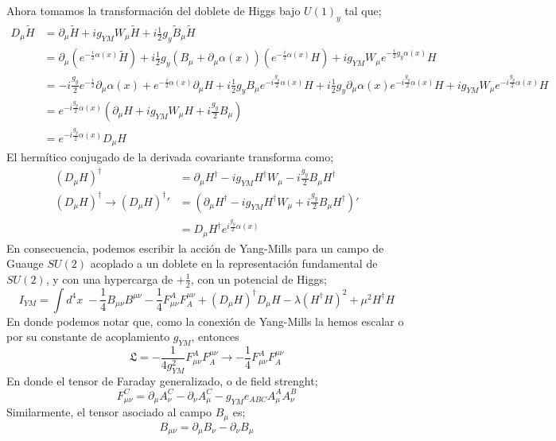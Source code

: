 \documentclass[../main.tex]{subfiles}
\begin{document}
 Ahora tomamos la transformación del doblete de Higgs bajo $U(1)_y$ tal que;
 \begin{align*}
   D_\mu \tilde{H} & = \partial_\mu \tilde{H} + ig_{YM} W_\mu \tilde{H} + i\frac{1}{2}g_y\tilde{B}_\mu \tilde{H}  \\
   & = \partial_\mu \left( e^{-\frac{i}{2}\alpha(x)}\tilde{H} \right) + i\frac{1}{2}g_y \left( B_\mu + \partial_\mu \alpha(x) \right) \left( e^{-\frac{i}{2}\alpha(x)}H \right) + ig_{YM}W_\mu e^{-\frac{i}{2}g_y\alpha(x)} H \\
  & = -i\frac{g_y}{2} e^{-\frac{i}{2}} \partial_\mu \alpha(x) + e^{-\frac{i}{2}\alpha(x)}\partial_\mu H + i\frac{1}{2} g_y B_\mu e^{-i\frac{g_y}{2}\alpha(x)}H + i\frac{1}{2}g_y \partial_\mu \alpha(x) e^{-i\frac{g_y}{2}\alpha(x)}H + ig_{YM}W_\mu e^{-i\frac{g_y}{2}\alpha(x)}H \\
  & = e^{-i\frac{g_y}{2}\alpha(x)} \left( \partial_\mu H + ig_{YM}W_\mu H + i\frac{g_y}{2}B_\mu \right) \\
   & = e^{-i\frac{g_y}{2}\alpha(x)} D_\mu H
 \end{align*}
 El hermítico conjugado de la derivada covariante transforma como; 
 \begin{align*}
   \left( D_\mu H \right)^\dagger & = \partial_\mu H^\dagger - ig_{YM} H^\dagger W_\mu - i\frac{g_y}{2}B_\mu H^\dagger \\
   \left( D_\mu H  \right)^\dagger \rightarrow \left( D_\mu H \right)^\dagger '& = \left( \partial_\mu H^\dagger - ig_{YM}H^\dagger W_\mu + i\frac{g_y}{2}B_\mu H^\dagger \right)' \\
   & = D_\mu  H^\dagger e^{i\frac{g_y}{2}\alpha(x)}
 \end{align*}
En consecuencia, podemos escribir la acción de Yang-Mills para un campo de Guauge $SU(2)$ acoplado a un doblete en la representación fundamental de $SU(2)$, y con una hypercarga de $+\frac{1}{2}$, con un potencial de Higgs;
\begin{equation}
  I_{YM} = \int d^4x \; -\frac{1}{4}B_{\mu\nu} B^{\mu\nu} - \frac{1}{4}F_{\mu\nu}^A F^{\mu\nu}_A + \left( D_\mu H \right)^\dagger D_\mu H - \lambda \left( H^\dagger H \right)^2 + \mu^2 H^\dagger H
 \end{equation}
 En donde podemos notar que, como la conexión de Yang-Mills la hemos escalar o por su constante de acoplamiento $g_{YM}$, entonces
 \begin{equation}
   \mathfrak{L} = -\frac{1}{4g_{YM}^2} F^A_{\mu\nu}F_A^{\mu\nu} \rightarrow -\frac{1}{4}F_{\mu\nu}^A F_A^{\mu\nu}
  \end{equation}
  En donde el tensor de Faraday generalizado, o de field strenght;
  \begin{equation}
    F^C_{\mu\nu} = \partial_\mu A^C_\nu - \partial_\nu A^C_\mu - g_{YM} e_{ABC} A^A_\mu A^B_\nu
   \end{equation}
  Similarmente, el tensor asociado al campo $B_\mu$ es;
  \begin{equation}
    B_{\mu\nu} = \partial_\mu B_\nu - \partial_\nu B_\mu
   \end{equation}
\end{document}
